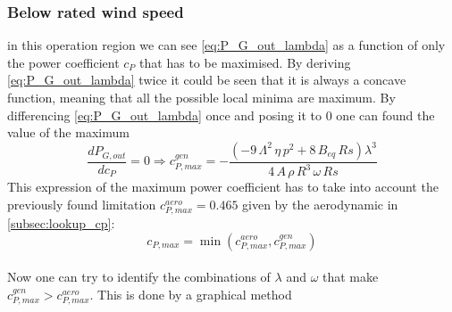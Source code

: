 \subsubsection{Below rated wind speed}
in this operation region we can see \autoref{eq:P_G_out_lambda} as a function of only the power coefficient $c_P$ that has to be maximised. By deriving \autoref{eq:P_G_out_lambda} twice it could be seen that it is always a concave function, meaning that all the possible local minima are maximum. By differencing \autoref{eq:P_G_out_lambda} once and posing it to 0 one can found the value of the maximum
\begin{equation}
  \frac{dP_{G,out}}{d c_P} = 0 \Rightarrow c_{P, max}^{gen} = -\frac{(-9\,\Lambda^2\,\eta\,p^2 + 8\,B_{eq}\,Rs)\lambda^3}{4\,A\,\rho\,R^3\,\omega\,Rs}
  \label{eq:cp_max}
\end{equation}
This expression of the maximum power coefficient has to take into account the previously found limitation $c_{P, max}^{aero} = 0.465$ given by the aerodynamic in \autoref{subsec:lookup_cp}: 
\begin{equation}
  c_{P, max} = \min\left(c_{P, max}^{aero}, c_{P, max}^{gen}\right)
  \label{eq:cp_max_final}
\end{equation}\\
Now one can try to identify the combinations of $\lambda$ and $\omega$ that make $c_{P, max}^{gen} > c_{P, max}^{aero}$. This is done by a graphical method

